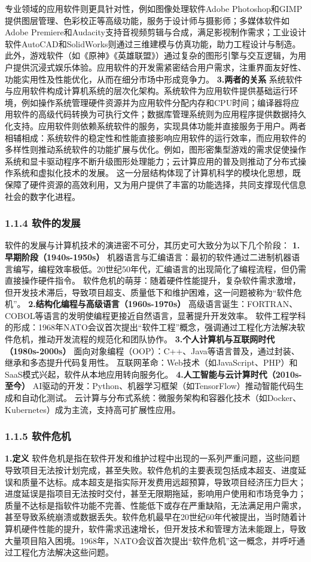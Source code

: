 专业领域的应用软件则更具针对性，例如图像处理软件Adobe Photoshop和GIMP提供图层管理、色彩校正等高级功能，服务于设计师与摄影师；多媒体软件如Adobe Premiere和Audacity支持音视频剪辑与合成，满足影视制作需求；工业设计软件AutoCAD和SolidWorks则通过三维建模与仿真功能，助力工程设计与制造。此外，游戏软件（如《原神》《英雄联盟》）通过复杂的图形引擎与交互逻辑，为用户提供沉浸式娱乐体验。应用软件的开发需紧密结合用户需求，注重界面友好性、功能实用性及性能优化，从而在细分市场中形成竞争力。 \textbf{3.两者的关系} 系统软件与应用软件构成计算机系统的层次化架构。系统软件为应用软件提供基础运行环境，例如操作系统管理硬件资源并为应用软件分配内存和CPU时间；编译器将应用软件的高级代码转换为可执行文件；数据库管理系统则为应用程序提供数据持久化支持。应用软件则依赖系统软件的服务，实现具体功能并直接服务于用户。两者相辅相成：系统软件的稳定性和性能直接影响应用软件的运行效率，而应用软件的多样性则推动系统软件的功能扩展与优化。例如，图形密集型游戏的需求促使操作系统和显卡驱动程序不断升级图形处理能力；云计算应用的普及则推动了分布式操作系统和虚拟化技术的发展。 这一分层结构体现了计算机科学的模块化思想，既保障了硬件资源的高效利用，又为用户提供了丰富的功能选择，共同支撑现代信息社会的数字化进程。 \subsubsection{1.1.4 软件的发展}\label{ux8f6fux4ef6ux7684ux53d1ux5c55} 软件的发展与计算机技术的演进密不可分，其历史可大致分为以下几个阶段： \textbf{1.早期阶段（1940s-1950s）} 机器语言与汇编语言：最初的软件通过二进制机器语言编写，编程效率极低。20世纪50年代，汇编语言的出现简化了编程流程，但仍需直接操作硬件指令。 软件危机的萌芽：随着硬件性能提升，复杂软件需求激增，但开发技术滞后，导致项目超支、质量低下和维护困难，这一问题被称为``软件危机''。 \textbf{2.结构化编程与高级语言（1960s-1970s）} 高级语言诞生：FORTRAN、COBOL等语言的发明使编程更接近自然语言，显著提升开发效率。 软件工程学科的形成：1968年NATO会议首次提出``软件工程''概念，强调通过工程化方法解决软件危机，推动开发流程的规范化和团队协作。 \textbf{3.个人计算机与互联网时代（1980s-2000s）} 面向对象编程（OOP）：C++、Java等语言普及，通过封装、继承和多态提升代码复用性。 互联网革命：Web技术（如JavaScript、PHP）和SaaS模式兴起，软件从本地应用转向服务化。 \textbf{4.人工智能与云计算时代（2010s-至今）} AI驱动的开发：Python、机器学习框架（如TensorFlow）推动智能代码生成和自动化测试。 云计算与分布式系统：微服务架构和容器化技术（如Docker、Kubernetes）成为主流，支持高可扩展性应用。 \subsubsection{1.1.5 软件危机}\label{ux8f6fux4ef6ux5371ux673a} \textbf{1.定义} 软件危机是指在软件开发和维护过程中出现的一系列严重问题，这些问题导致项目无法按计划完成，甚至失败。软件危机的主要表现包括成本超支、进度延误和质量不达标。成本超支是指实际开发费用远超预算，导致项目经济压力巨大；进度延误是指项目无法按时交付，甚至无限期拖延，影响用户使用和市场竞争力；质量不达标是指软件功能不完善、性能低下或存在严重缺陷，无法满足用户需求，甚至导致系统崩溃或数据丢失。软件危机最早在20世纪60年代被提出，当时随着计算机硬件性能的提升，软件需求迅速增长，但开发技术和管理方法未能跟上，导致大量项目陷入困境。1968年，NATO会议首次提出``软件危机''这一概念，并呼吁通过工程化方法解决这些问题。 